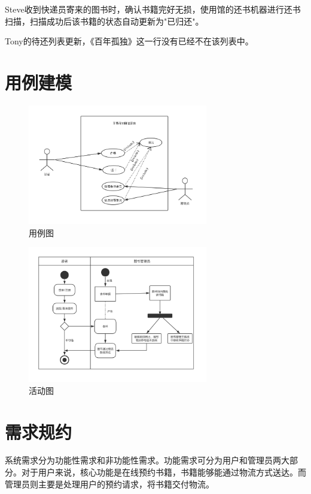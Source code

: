 Steve收到快递员寄来的图书时，确认书籍完好无损，使用馆的还书机器进行还书扫描，扫描成功后该书籍的状态自动更新为"已归还"。

Tony的待还列表更新，《百年孤独》这一行没有已经不在该列表中。
\section{用例建模}
\begin{figure}[H] %
    \centering %
    \includegraphics[width=0.7\textwidth]{./Chapters/images/example.png} %
    \caption{用例图} %
    \label{用例图} %
\end{figure}
\begin{figure}[H] %
    \centering %
    \includegraphics[width=0.7\textwidth]{./Chapters/images/activity.png} %
    \caption{活动图} %
    \label{活动图} %
\end{figure}
\section{需求规约}
系统需求分为功能性需求和非功能性需求。功能需求可分为用户和管理员两大部分。对于用户来说，核心功能是在线预约书籍，书籍能够能通过物流方式送达。而管理员则主要是处理用户的预约请求，将书籍交付物流。
